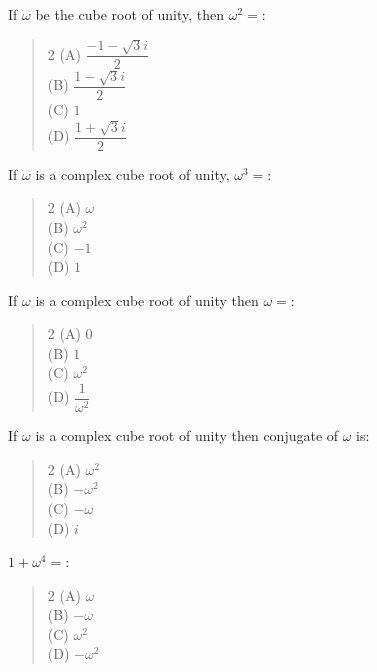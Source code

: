 \documentclass[11pt,a4paper]{article}
\begin{document}
\begin{mcqlist}
\item If $\omega$ be the cube root of unity, then $\omega^2=$:
\begin{quote}\begin{multicols}{2}
\noindent (A) $\dfrac{-1-\sqrt3 i}{2}$ \\
(B) $\dfrac{1-\sqrt3 i}{2}$ \\
(C) $1$ \\
(D) $\dfrac{1+\sqrt3 i}{2}$
\end{multicols}\end{quote}

\item If $\omega$ is a complex cube root of unity, $\omega^3=$:
\begin{quote}\begin{multicols}{2}
\noindent (A) $\omega$ \\
(B) $\omega^2$ \\
(C) $-1$ \\
(D) $1$
\end{multicols}\end{quote}

\item If $\omega$ is a complex cube root of unity then $\omega=$:
\begin{quote}\begin{multicols}{2}
\noindent (A) $0$ \\
(B) $1$ \\
(C) $\omega^2$ \\
(D) $\dfrac{1}{\omega^2}$
\end{multicols}\end{quote}

\item If $\omega$ is a complex cube root of unity then conjugate of $\omega$ is:
\begin{quote}\begin{multicols}{2}
\noindent (A) $\omega^2$ \\
(B) $-\omega^2$ \\
(C) $-\omega$ \\
(D) $i$
\end{multicols}\end{quote}

\item $1+\omega^4=$:
\begin{quote}\begin{multicols}{2}
\noindent (A) $\omega$ \\
(B) $-\omega$ \\
(C) $\omega^2$ \\
(D) $-\omega^2$
\end{multicols}\end{quote}


\end{mcqlist}
\end{document}
